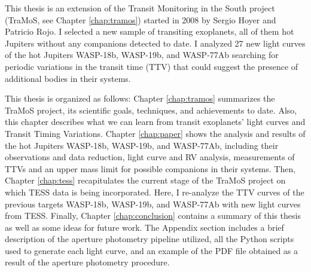This thesis is an extension of the Transit Monitoring in the South project (TraMoS, see Chapter \ref{chap:tramos}) started in 2008 by Sergio Hoyer and Patricio Rojo. I selected a new sample of transiting exoplanets, all of them hot Jupiters without any companions detected to date. I analyzed 27 new light curves of the hot Jupiters WASP-18b, WASP-19b, and WASP-77Ab searching for periodic variations in the transit time (TTV) that could suggest the presence of additional bodies in their systems. 

This thesis is organized as follows: Chapter \ref{chap:tramos} summarizes the TraMoS project, its scientific goals, techniques, and achievements to date. Also, this chapter describes what we can learn from transit exoplanets' light curves and Transit Timing Variations. Chapter \ref{chap:paper} shows the analysis and results of the hot Jupiters WASP-18b, WASP-19b, and WASP-77Ab, including their observations and data reduction, light curve and RV analysis, measurements of TTVs and an upper mass limit for possible companions in their systems. Then, Chapter \ref{chap:tess}  recapitulates the current stage of the TraMoS project on which TESS data is being incorporated. Here, I re-analyze the TTV curves of the previous targets WASP-18b, WASP-19b, and WASP-77Ab with new light curves from TESS. Finally, Chapter \ref{chap:conclusion} contains a summary of this thesis as well as some ideas for future work. The Appendix section includes a brief description of the aperture photometry pipeline utilized, all the Python scripts used to generate each light curve, and an example of the PDF file obtained as a result of the aperture photometry procedure.

